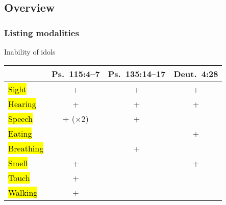 \subsection{Overview}




\subsubsection{Listing modalities}

\begin{frame}{Inability of idols}
	\begin{tabular}{l|ccc}
		& Ps.~115:4–7           & Ps.~135:14–17 & Deut.~4:28\\
		\hline
		\hl{Sight}     & +                     & +             & +\\
		\hl{Hearing}   & +                     & +             & +\\
		\hl{Speech}    & \phantom{(×2) }+ (×2) & +             & \\
		\hl{Eating}    &                       &               & +\\
		\hl{Breathing} &                       & +             & \\
		\hl{Smell}     & +                     &               & +\\
		\hl{Touch}     & +                     &               & \\
		\hl{Walking}   & +                     &               &
	\end{tabular}

\end{frame}


